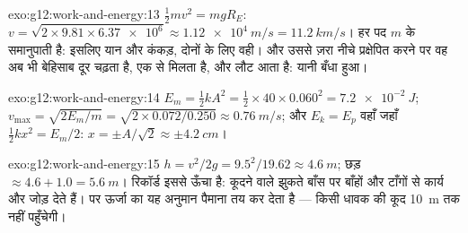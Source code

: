 \begin{solution}{exo:g12:work-and-energy:13}
$\tfrac12 mv^2 = mgR_E$: $v = \sqrt{2 \times 9.81 \times \num{6.37e6}} \approx \qty{1.12e4}{m/s}
= \qty{11.2}{km/s}$। हर पद $m$ के समानुपाती है: इसलिए यान और कंकड़, दोनों के लिए
वही। और उससे ज़रा नीचे प्रक्षेपित करने पर वह अब भी बेहिसाब दूर चढ़ता है, एक
 से मिलता है, और लौट आता है: यानी बँधा हुआ।
\end{solution}

\begin{solution}{exo:g12:work-and-energy:14}
$E_m = \tfrac12 kA^2 = \tfrac12 \times 40 \times 0.060^2 =
\qty{7.2e-2}{J}$; $v_{\max} = \sqrt{2E_m/m} =
\sqrt{2 \times 0.072/0.250} \approx \qty{0.76}{m/s}$; और $E_k = E_p$ वहाँ जहाँ $\tfrac12 kx^2 = E_m/2$: $x = \pm A/\sqrt 2 \approx
\pm\qty{4.2}{cm}$।
\end{solution}

\begin{solution}{exo:g12:work-and-energy:15}
$h = v^2/2g = 9.5^2/19.62 \approx \qty{4.6}{m}$; छड़ $\approx
4.6 + 1.0 = \qty{5.6}{m}$। रिकॉर्ड इससे ऊँचा है: कूदने वाले झुकते बाँस पर बाँहों और
टाँगों से कार्य और जोड़ देते हैं। पर ऊर्जा का यह अनुमान पैमाना
तय कर देता है --- किसी धावक की कूद \qty{10}{m} तक नहीं पहुँचेगी।
\end{solution}

